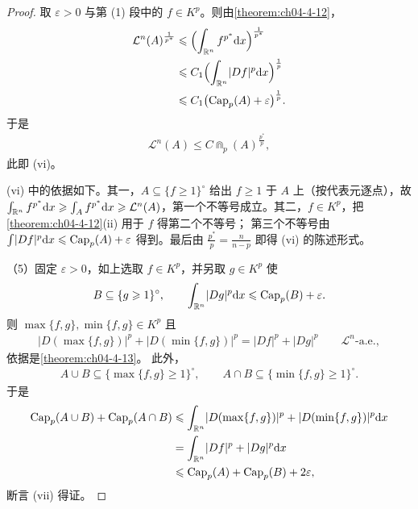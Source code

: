 \documentclass[../../main.tex]{subfiles}%
\begin{document}
\begin{proof}
取 $\varepsilon>0$ 与第 (1) 段中的 $f\in K^p$。则由\cref{theorem:ch04-4-12}，%
\begin{align*}
\mathcal{L}^n(A)^{\frac{1}{p^*}}&\leqslant\Bigl(\int_{\mathbb{R}^n}f^{p^*}\mathrm{d} x\Bigr)^{\frac{1}{p^*}}\\
&\leqslant C_1\Bigl(\int_{\mathbb{R}^n}\lvert Df\rvert^p\mathrm{d} x\Bigr)^{\frac{1}{p}}\\
&\leqslant C_1\bigl(\operatorname{Cap}_p(A)+\varepsilon\bigr)^{\frac{1}{p}} .
\end{align*}
于是
\begin{align*}
\mathcal{L}^n(A)\leqslant C\Cap_p(A)^{\frac{p^*}{p}},
\end{align*}
此即 (vi)。

(vi) 中的依据如下。其一，$A\subseteq\{f\geqslant1\}^{\circ}$ 给出 $f\geqslant1$ 于 $A$ 上（按代表元逐点），故 $\int_{\mathbb{R}^n}f^{p^*}\mathrm{d} x\geqslant\int_Af^{p^*}\mathrm{d} x\geqslant\mathcal{L}^n(A)$，第一个不等号成立。其二，$f\in K^p$，把\cref{theorem:ch04-4-12}(ii) 用于 $f$ 得第二个不等号；%
第三个不等号由 $\int\lvert Df\rvert^p\mathrm{d} x\leqslant\operatorname{Cap}_p(A)+\varepsilon$ 得到。最后由 $\frac{p^*}{p}=\frac{n}{n-p}$ 即得 (vi) 的陈述形式。

（5）固定 $\varepsilon>0$，如上选取 $f\in K^p$，并另取 $g\in K^p$ 使
\begin{align*}
B\subseteq\{g\geqslant1\}^{\circ},\qquad\int_{\mathbb{R}^n}\lvert Dg\rvert^p\mathrm{d} x\leqslant\operatorname{Cap}_p(B)+\varepsilon .
\end{align*}
则 $\max\{f,g\},\min\{f,g\}\in K^p$ 且
\begin{align*}
\lvert D(\max\{f,g\})\rvert^p+\lvert D(\min\{f,g\})\rvert^p=\lvert Df\rvert^p+\lvert Dg\rvert^p\qquad\mathcal{L}^n\text{-a.e.},
\end{align*}
依据是\cref{theorem:ch04-4-13}。%
此外，
\begin{align*}
A\cup B\subseteq\{\max\{f,g\}\geqslant1\}^{\circ},\qquad A\cap B\subseteq\{\min\{f,g\}\geqslant1\}^{\circ}.
\end{align*}
于是
\begin{align*}
\operatorname{Cap}_p(A\cup B)+\operatorname{Cap}_p(A\cap B)&\leqslant\int_{\mathbb{R}^n}\lvert D(\max\{f,g\})\rvert^p+\lvert D(\min\{f,g\})\rvert^p\mathrm{d} x\\
&=\int_{\mathbb{R}^n}\lvert Df\rvert^p+\lvert Dg\rvert^p\mathrm{d} x\\
&\leqslant\operatorname{Cap}_p(A)+\operatorname{Cap}_p(B)+2\varepsilon ,
\end{align*}
断言 (vii) 得证。


\end{proof}
\end{document}
